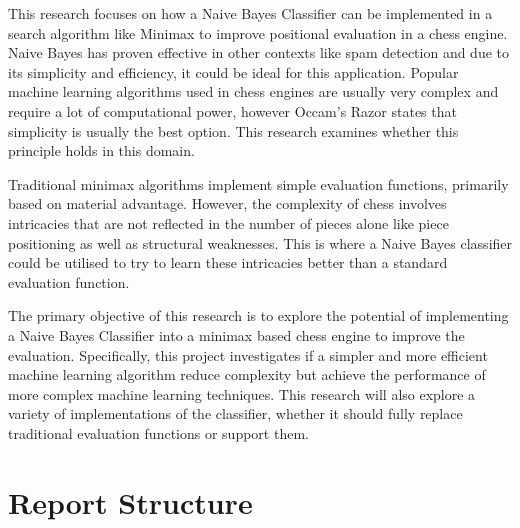 \documentclass[20pt]{informatics-report}
\begin{document}
This research focuses on how a Naive Bayes Classifier can be implemented in a search algorithm like Minimax to improve positional evaluation in a chess engine. Naive Bayes has proven effective in other contexts like spam detection and due to its simplicity and efficiency, it could be ideal for this application. Popular machine learning algorithms used in chess engines are usually very complex and require a lot of computational power, however Occam's Razor states that simplicity is usually the best option. This research examines whether this principle holds in this domain. 

Traditional minimax algorithms implement simple evaluation functions, primarily based on material advantage. However, the complexity of chess involves intricacies that are not reflected in the number of pieces alone like piece positioning as well as structural weaknesses. This is where a Naive Bayes classifier could be utilised to try to learn these intricacies better than a standard evaluation function.

The primary objective of this research is to explore the potential of implementing a Naive Bayes Classifier into a minimax based chess engine to improve the evaluation. Specifically, this project investigates if a simpler and more efficient machine learning algorithm reduce complexity but achieve the performance of more complex machine learning techniques. This research will also explore a variety of implementations of the classifier, whether it should fully replace traditional evaluation functions or support them.





\section{Report Structure}



% 

% 
% 
% 








\appendix



\end{document}
